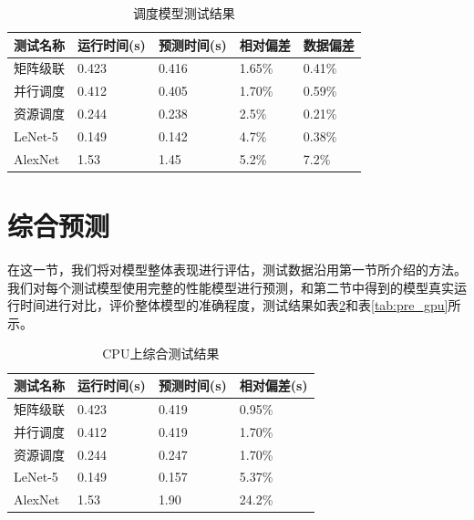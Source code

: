     \begin{table}[!htbp]
        \centering
	    \caption{调度模型测试结果}
        \label{tab:sche}
        \begin{tabular}{|l|l|l|l|l|}
            \hline
            测试名称 & 运行时间(s) & 预测时间(s) & 相对偏差 & 数据偏差\\
            \hline
            矩阵级联 & 0.423 & 0.416 & 1.65\% & 0.41\% \\
            \hline
            并行调度 & 0.412 & 0.405 & 1.70\% & 0.59\% \\
            \hline
            资源调度 & 0.244 & 0.238 & 2.5\% & 0.21\% \\
            \hline
            LeNet-5 & 0.149 & 0.142 & 4.7\% & 0.38\% \\
            \hline
            AlexNet & 1.53 & 1.45 & 5.2\% & 7.2\% \\
            \hline
        \end{tabular}
    \end{table}

\section{综合预测}
    在这一节，我们将对模型整体表现进行评估，测试数据沿用第一节所介绍的方法。我们对每个测试模型使用完整的性能模型进行预测，和第二节中得到的模型真实运行时间进行对比，评价整体模型的准确程度，测试结果如表\ref{tab:pre_cpu}和表\ref{tab:pre_gpu}所示。
    
    \begin{table}[!htbp]
        \centering
	    \caption{CPU上综合测试结果}
        \label{tab:pre_cpu}
        \begin{tabular}{|l|l|l|l|}
            \hline
            测试名称 & 运行时间(s) & 预测时间(s) & 相对偏差(s)\\
            \hline
            矩阵级联 & 0.423 & 0.419 & 0.95\% \\
            \hline
            并行调度 & 0.412 & 0.419 & 1.70\% \\
            \hline
            资源调度 & 0.244 & 0.247 & 1.70\% \\
            \hline
            LeNet-5 & 0.149 & 0.157 & 5.37\% \\
            \hline
            AlexNet & 1.53 & 1.90 & 24.2\% \\
            \hline
        \end{tabular}
    \end{table}
    
